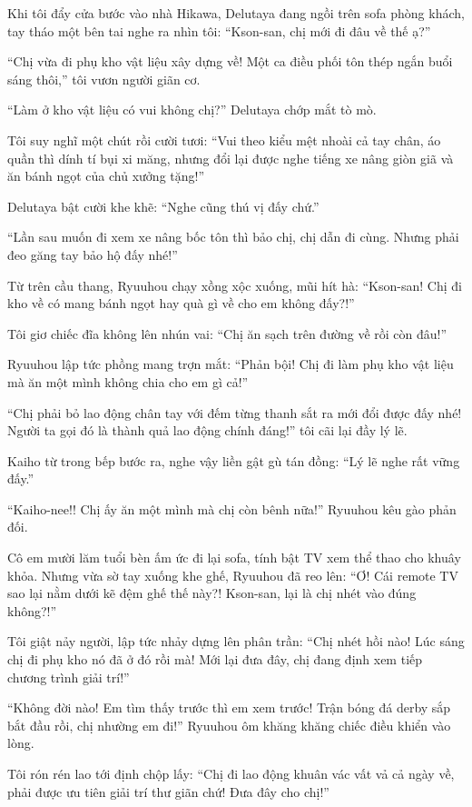﻿\documentclass[../main.tex]{subfiles}
\begin{document}
Khi tôi đẩy cửa bước vào nhà Hikawa, Delutaya đang ngồi trên sofa phòng khách, tay tháo một bên tai nghe ra nhìn tôi: ``Kson-san, chị mới đi đâu về thế ạ?''

``Chị vừa đi phụ kho vật liệu xây dựng về! Một ca điều phối tôn thép ngắn buổi sáng thôi,'' tôi vươn người giãn cơ.

``Làm ở kho vật liệu có vui không chị?'' Delutaya chớp mắt tò mò.

Tôi suy nghĩ một chút rồi cười tươi: ``Vui theo kiểu mệt nhoài cả tay chân, áo quần thì dính tí bụi xi măng, nhưng đổi lại được nghe tiếng xe nâng giòn giã và ăn bánh ngọt của chủ xưởng tặng!''

Delutaya bật cười khe khẽ: ``Nghe cũng thú vị đấy chứ.''

``Lần sau muốn đi xem xe nâng bốc tôn thì bảo chị, chị dẫn đi cùng. Nhưng phải đeo găng tay bảo hộ đấy nhé!''

Từ trên cầu thang, Ryuuhou chạy xồng xộc xuống, mũi hít hà: ``Kson-san! Chị đi kho về có mang bánh ngọt hay quà gì về cho em không đấy?!''

Tôi giơ chiếc đĩa không lên nhún vai: ``Chị ăn sạch trên đường về rồi còn đâu!''

Ryuuhou lập tức phồng mang trợn mắt: ``Phản bội! Chị đi làm phụ kho vật liệu mà ăn một mình không chia cho em gì cả!''

``Chị phải bỏ lao động chân tay với đếm từng thanh sắt ra mới đổi được đấy nhé! Người ta gọi đó là thành quả lao động chính đáng!'' tôi cãi lại đầy lý lẽ.

Kaiho từ trong bếp bước ra, nghe vậy liền gật gù tán đồng: ``Lý lẽ nghe rất vững đấy.''

``Kaiho-nee!! Chị ấy ăn một mình mà chị còn bênh nữa!'' Ryuuhou kêu gào phản đối.

Cô em mười lăm tuổi bèn ấm ức đi lại sofa, tính bật TV xem thể thao cho khuây khỏa. Nhưng vừa sờ tay xuống khe ghế, Ryuuhou đã reo lên: ``Ơ! Cái remote TV sao lại nằm dưới kẽ đệm ghế thế này?! Kson-san, lại là chị nhét vào đúng không?!''

Tôi giật nảy người, lập tức nhảy dựng lên phân trần: ``Chị nhét hồi nào! Lúc sáng chị đi phụ kho nó đã ở đó rồi mà! Mới lại đưa đây, chị đang định xem tiếp chương trình giải trí!''

``Không đời nào! Em tìm thấy trước thì em xem trước! Trận bóng đá derby sắp bắt đầu rồi, chị nhường em đi!'' Ryuuhou ôm khăng khăng chiếc điều khiển vào lòng.

Tôi rón rén lao tới định chộp lấy: ``Chị đi lao động khuân vác vất vả cả ngày về, phải được ưu tiên giải trí thư giãn chứ! Đưa đây cho chị!''
\end{document}
